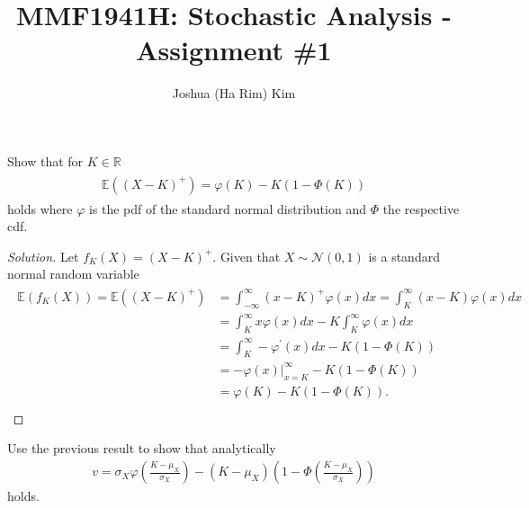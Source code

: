 \documentclass[10pt]{article}
\newcommand{\E}{\mathbb{E}}
\newcommand{\R}{\mathbb{R}}
\newenvironment{problem}[2][Problem]{\begin{trivlist}
\item[\hskip \labelsep {\bfseries #1}\hskip \labelsep {\bfseries #2.}]}{\end{trivlist}}
\begin{document}
\title{MMF1941H: Stochastic Analysis - Assignment \#1}
\author{Joshua (Ha Rim) Kim}
\maketitle



\begin{problem}{1}
    Show that for $K \in \R$
    \begin{align*}
        \begin{split}
            \E((X - K)^+) = \varphi(K) - K(1 - \Phi(K))
        \end{split}
    \end{align*}
    holds where $\varphi$ is the pdf of the standard normal distribution and $\Phi$ the respective cdf.
\end{problem}

\begin{proof}[Solution]
    Let $f_K (X) = (X - K)^+$. Given that $X \sim \mathcal{N}(0, 1)$ is a standard normal random variable
    \begin{align*}
        \begin{split}
            \E(f_K (X)) = \E((X - K)^+) &= \int_{-\infty}^{\infty} (x - K)^+ \varphi(x) dx = \int_{K}^{\infty} (x - K) \varphi(x) dx \\
            &= \int_{K}^{\infty} x \varphi(x) dx - K{\int_{K}^{\infty} \varphi(x) dx} \\
            &= \int_{K}^{\infty} -\varphi^\prime(x) dx - K(1 - \Phi(K)) \\
            &= \left. -\varphi(x) \right\rvert_{x = K}^{\infty} - K(1 - \Phi(K)) \\
            &= \varphi(K) - K(1 - \Phi(K)). \\
        \end{split}
    \end{align*}
\end{proof}



\begin{problem}{2}
    Use the previous result to show that analytically
    \begin{align*}
        v = \sigma_X \varphi{\left(\frac{K - \mu_X}{\sigma_X}\right)} - (K - \mu_X) \left(1 - \Phi{\left(\frac{K - \mu_X}{\sigma_X}\right)}\right)
    \end{align*}
    holds.
\end{problem}
    
\end{document}
